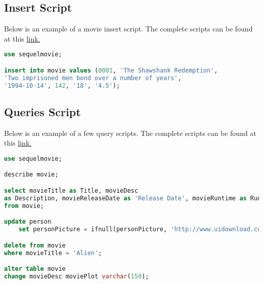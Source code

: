\documentclass[12pt]{article}
\begin{document}
\newpage
\subsection{Insert Script}
Below is an example of a movie insert script. The complete scripts can be found at this \href{https://github.com/ciaranRoche/mySQL-movie-db/blob/master/database-insert-script.sql}{link.}
\begin{lstlisting}[language=SQL]
use sequelmovie;

insert into movie values (0001, 'The Shawshank Redemption',
'Two imprisoned men bond over a number of years', 
'1994-10-14', 142, '18', '4.5');

\end{lstlisting}

\subsection{Queries Script}
Below is an example of a few query scripts. The complete scripts can be found at this \href{https://github.com/ciaranRoche/mySQL-movie-db/blob/master/database-queries-scripts.sql}{link.}
\begin{lstlisting}[language=SQL]
use sequelmovie;

describe movie;

select movieTitle as Title, movieDesc 
as Description, movieReleaseDate as 'Release Date', movieRuntime as Runtime
from movie;

update person
	set personPicture = ifnull(personPicture, 'http://www.uidownload.com/files/478/82/442/error-404-page-not-found-icon.jpg');

delete from movie
where movieTitle = 'Alien';

alter table movie
change movieDesc moviePlot varchar(150);
\end{lstlisting}

\newpage
\end{document}
